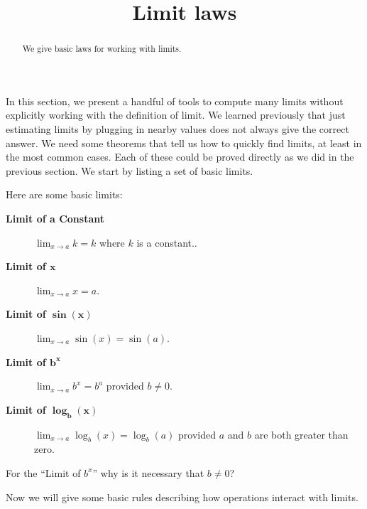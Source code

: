 \documentclass{ximera}
\title{Limit laws}
\begin{document}
\begin{abstract}
We give basic laws for working with limits. 
\end{abstract}
\maketitle

In this section, we present a handful of tools to compute many limits
without explicitly working with the definition of limit.  We learned
previously that just estimating limits by plugging in nearby values
does not always give the correct answer.  We need some theorems that
tell us how to quickly find limits, at least in the most common cases.
Each of these could be proved directly as we did in the previous
section. We start by listing a set of basic limits. 


\begin{theorem}
  Here are some basic limits:
  \begin{description}
  \item[\textbf{Limit of a Constant}] $\lim_{x\to a} k = k$ where $k$
    is a constant..
  \item[\textbf{Limit of $\boldsymbol{x}$}] $\lim_{x\to a}x =a$.
  \item[\textbf{Limit of $\boldsymbol{\sin(x)}$}] $\lim_{x\to a}
    \sin(x) = \sin(a)$.
  \item[\textbf{Limit of $\boldsymbol{b^x}$}] $\lim_{x\to a} b^x =
    b^a$ provided $b\ne 0$.
  \item[\textbf{Limit of $\boldsymbol{\log_b(x)}$}] $\lim_{x\to a}
    \log_b(x) = \log_b(a)$ provided $a$ and $b$ are both greater than
    zero.
  \end{description}
\end{theorem}

\begin{question}
  For the ``Limit of $b^x$'' why is it necessary that $b\ne 0$?
  \begin{freeResponse}[given]
  \end{freeResponse}
\end{question}

Now we will give some basic rules describing how operations interact
with limits.
\end{document}
